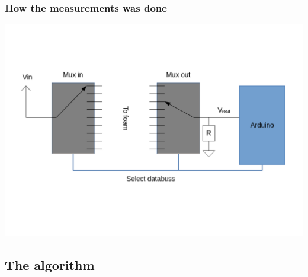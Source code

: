 \documentclass{beamer}
\begin{document}
\begin{frame}
    \frametitle{How the measurements was done}
    \begin{center}
        \includegraphics[width=.8\textwidth]{img/arduino_foam.png}
    \end{center}

\end{frame}

\subsection{The algorithm}%
\label{sub:algorithm}
\end{document}
